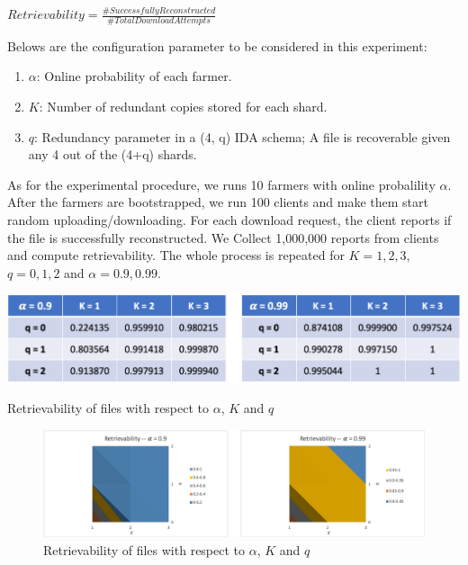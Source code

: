 \begin{center}
  $Retrievability = \frac{\# Successfully Reconstructed}{\# Total Download Attempts}$
\end{center}

\noindent Belows are the configuration parameter to be considered in this experiment:

\begin{enumerate}
  \item $\alpha$: Online probability of each farmer.
  \item $K$: Number of redundant copies stored for each shard.
  \item $q$: Redundancy parameter in a (4, q) IDA schema; A file is recoverable given any 4 out of the (4+q) shards.
\end{enumerate}

As for the experimental procedure, we runs 10 farmers with online probalility $\alpha$. After the farmers are bootstrapped, we run 100 clients and make them start random uploading/downloading. For each download request, the client reports if the file is successfully reconstructed. We Collect 1,000,000 reports from clients and compute retrievability. The whole process is repeated for $K=1,2,3$, $q=0,1,2$ and $\alpha=0.9,0.99$.

\begin{table}[hbt]
  \centering
    \includegraphics[width=14cm]{tables/table_retrievability.png}
    \caption{Retrievability of files with respect to $\alpha$, $K$ and $q$}
    \label{table:retrievability}
\end{table}
  
\begin{figure}[hbt]
  \centering
    \includegraphics[width=14cm]{charts/chart_retrievability.png}
    \caption{Retrievability of files with respect to $\alpha$, $K$ and $q$}
    \label{fig:retrievability}
\end{figure}

